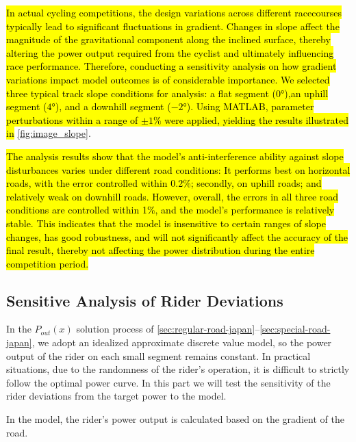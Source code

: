 \documentclass{mcmthesis}
\newcommand{\hltext}[1]{\colorbox{yellow!40}{#1}}
\begin{document}
\hl{In actual cycling competitions, the design variations across different racecourses typically lead to significant fluctuations in gradient. Changes in slope affect the magnitude of the gravitational component along the inclined surface, thereby altering the power output required from the cyclist and ultimately influencing race performance. Therefore, conducting a sensitivity analysis on how gradient variations impact model outcomes is of considerable importance.
We selected three typical track slope conditions for analysis:  a flat segment ($0°$),an uphill segment ($4°$),   and a downhill segment ($-2°$).
Using MATLAB, parameter perturbations within a range of $±1\%$ were applied, 
yielding the results illustrated in}\hltext{ \autoref{fig:image_slope}.}

\hl{The analysis results show that the model's anti-interference ability against slope disturbances varies under different road conditions:
It performs best on horizontal roads, with the error controlled within 0.2\%; secondly, on uphill roads;
and relatively weak on downhill roads. However, overall, the errors in all three road conditions are controlled within 1\%,
and the model's performance is relatively stable. This indicates that the model is insensitive to certain ranges of slope changes,
has good robustness, and will not significantly affect the accuracy of the final result, thereby not affecting the power distribution during the entire competition period.}
\subsection{Sensitive Analysis of Rider Deviations}
In the $P_{out}(x)$ solution process of \autoref{sec:regular-road-japan}--\autoref{sec:special-road-japan}, we adopt an idealized approximate discrete value model, so the power output of the rider on each small segment remains constant. In practical situations, due to the randomness of the rider's operation, it is difficult to strictly follow the optimal power curve. In this part we will test the sensitivity of the rider deviations from the target power to the model.

In the model, the rider's power output is calculated based on the gradient of the road.
\end{document}
